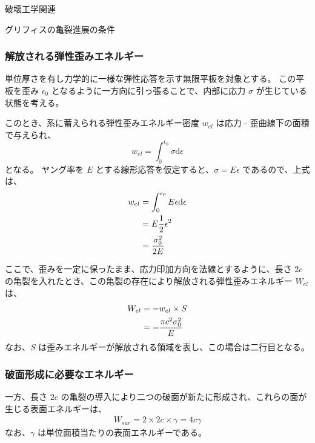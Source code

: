 \documentclass[11pt,a4paper]{jsarticle}
\makeatletter
\def\diff{\mathrm d}
\def\section{\@startsection 
{section}
{1}
{\z@}
{3.5ex plus -1ex minus -.2ex}
{1.5ex plus .2ex}
{\large\bf}
}
\def\subsection{\@startsection 
{subsection}
{1}
{\z@}
{3.5ex plus -1ex minus -.2ex}
{1.ex plus .2ex}
{\large\bf}
}
\makeatother
\begin{document}
\begin{appendix}
\section{破壊工学関連}


\subsection{グリフィスの亀裂進展の条件}

\subsubsection{解放される弾性歪みエネルギー}

単位厚さを有し力学的に一様な弾性応答を示す無限平板を対象とする。
この平板を歪み $\epsilon_0$ となるように一方向に引っ張ることで、内部に応力 $\sigma$ が生じている状態を考える。

このとき、系に蓄えられる弾性歪みエネルギー密度 $w_{el}$ は応力 - 歪曲線下の面積で与えられ、
\begin{equation}
w_{el} = \int_0^{\epsilon_0} \sigma \diff \epsilon
\end{equation}
となる。
ヤング率を $E$ とする線形応答を仮定すると、$\sigma = E \epsilon$ であるので、上式は、
\begin{align}
w_{el} 
	&= \int_0^{\epsilon_0} E \epsilon \diff \epsilon \notag \\
	&= E \dfrac{1}{2} \epsilon^2 \notag \\
	&= \dfrac{\sigma_0^2}{2E} 
\end{align}

ここで、歪みを一定に保ったまま、応力印加方向を法線とするように、長さ $2c$ の亀裂を入れたとき、この亀裂の存在により解放される弾性歪みエネルギー $W_{el}$ は、
\begin{align}
W_{el}
	&=-w_{el}\times S \notag \\
	&=-\dfrac{\pi c^2 \sigma_0^2}{E}
\end{align}
なお、$S$ は歪みエネルギーが解放される領域を表し、この場合は二行目となる。

\subsubsection{破面形成に必要なエネルギー}

一方、長さ $2c$ の亀裂の導入により二つの破面が新たに形成され、これらの面が生じる表面エネルギーは、
\begin{align}
W_{sur} = 2 \times 2c \times \gamma = 4c \gamma
\end{align}
なお、$\gamma$ は単位面積当たりの表面エネルギーである。


\end{appendix}
\end{document}
